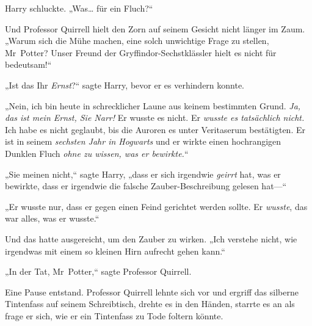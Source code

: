 Harry schluckte. „Was… für ein Fluch?“

Und Professor Quirrell hielt den Zorn auf seinem Gesicht nicht länger im Zaum. „Warum sich die Mühe machen, eine solch unwichtige Frage zu stellen, Mr~Potter? Unser Freund der Gryffindor-Sechstklässler hielt es nicht für bedeutsam!“

„Ist das Ihr \emph{Ernst}?“ sagte Harry, bevor er es verhindern konnte.

„Nein, ich bin heute in schrecklicher Laune aus keinem bestimmten Grund. \emph{Ja, das ist mein Ernst, Sie Narr!} Er wusste es nicht. Er \emph{wusste es tatsächlich nicht.} Ich habe es nicht geglaubt, bis die Auroren es unter Veritaserum bestätigten. Er ist in seinem \emph{sechsten Jahr in Hogwarts} und er wirkte einen hochrangigen Dunklen Fluch \emph{ohne zu wissen, was er bewirkte.}“

„Sie meinen nicht,“ sagte Harry, „dass er sich irgendwie \emph{geirrt} hat, was er bewirkte, dass er irgendwie die falsche Zauber-Beschreibung gelesen hat—“

„Er wusste nur, dass er gegen einen Feind gerichtet werden sollte. Er \emph{wusste}, das war alles, was er wusste.“

Und das hatte ausgereicht, um den Zauber zu wirken. „Ich verstehe nicht, wie irgendwas mit einem so kleinen Hirn aufrecht gehen kann.“

„In der Tat, Mr~Potter,“ sagte Professor Quirrell.

Eine Pause entstand. Professor Quirrell lehnte sich vor und ergriff das silberne Tintenfass auf seinem Schreibtisch, drehte es in den Händen, starrte es an als frage er sich, wie er ein Tintenfass zu Tode foltern könnte.

